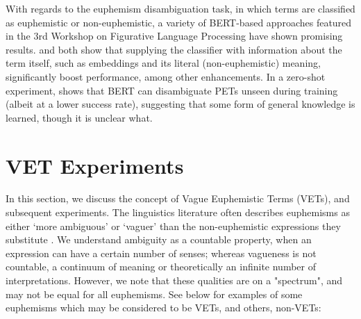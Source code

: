 \documentclass[11pt]{article}
\begin{document}
 With regards to the euphemism disambiguation task, in which terms are classified as euphemistic or non-euphemistic, a variety of BERT-based approaches featured in the 3rd Workshop on Figurative Language Processing have shown promising results. \citet{eureka:22} and \citet{kesen2022detecting} both show that supplying the classifier with information about the term itself, such as embeddings and its literal (non-euphemistic) meaning, significantly boost performance, among other enhancements. In a zero-shot experiment, \citet{keh:22} shows that BERT can disambiguate PETs unseen during training (albeit at a lower success rate), suggesting that some form of general knowledge is learned, though it is unclear what. 


\section{VET Experiments}

In this section, we discuss the concept of Vague Euphemistic Terms (VETs), and subsequent experiments. The linguistics literature often describes euphemisms as either `more ambiguous' or `vaguer' than the non-euphemistic expressions they substitute \cite{burridge2012euphemism,williamson2002vagueness,egre2011introduction,russell1923vagueness,di2013vagueness}. We understand ambiguity as a countable property, when an expression can have a certain number of senses; whereas vagueness is not countable, a continuum of meaning or theoretically an infinite number of interpretations. However, we note that these qualities are on a "spectrum", and may not be equal for all euphemisms. See below for examples of some euphemisms which may be considered to be VETs, and others, non-VETs:
\end{document}
